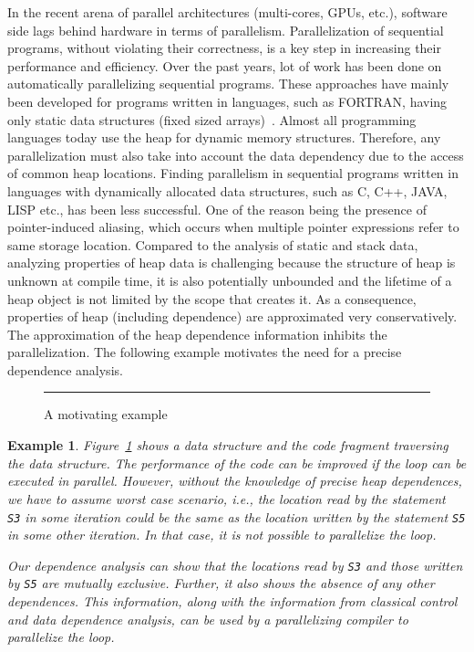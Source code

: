 \documentclass{IOS-Book-Article}
\newtheorem{example}{Example}
\begin{document}
In the recent arena of parallel architectures (multi-cores,
GPUs, etc.), software side lags behind hardware in terms of
parallelism. Parallelization of sequential programs, without
violating their correctness, is a key step in increasing
their performance and efficiency. Over the past years, lot of
work has been done on automatically parallelizing sequential
programs. These approaches have mainly been developed for
programs written in languages, such as FORTRAN, having only
static data structures (fixed sized
arrays)~\cite{Allen87automatic,Banerjee93automatic,Wolf91loop,
  Kennedy01Optimizing}.  Almost all programming languages
today use the heap for dynamic memory structures. Therefore,
any parallelization must also take into account the data
dependency due to the access of common heap
locations. Finding parallelism in sequential programs written
in languages with dynamically allocated data structures, such
as C, C++, JAVA, LISP etc., has been less successful. One of
the reason being the presence of pointer-induced aliasing,
which occurs when multiple pointer expressions refer to same
storage location. Compared to the analysis of static and
stack data, analyzing properties of heap data is challenging
because the structure of heap is unknown at compile time, it
is also potentially unbounded and the lifetime of a heap
object is not limited by the scope that creates it. As a
consequence, properties of heap (including dependence) are
approximated very conservatively. The approximation of the
heap dependence information inhibits the parallelization. The
following example motivates the need for a precise dependence
analysis.
  \begin{figure}[t]
    \centering
    
    \label{fig:motiv}
    \caption{A motivating example}
    \hrule
  \end{figure}
\begin{example}{\rm
  Figure~\ref{fig:motiv}
  shows a data structure and the code fragment traversing the
  data structure. The performance of the code can be improved if the loop can
  be executed in parallel. However, without the knowledge of
  precise heap dependences, we have to assume worst case
  scenario, i.e.,  the  location read by the statement {\tt
    S3} in some iteration could be the same as the location
  written by the statement {\tt S5} in some other iteration.
  In that case,  it is not possible to parallelize the loop.
 
  Our dependence analysis can show that the locations read by
  {\tt S3} and those written by {\tt S5} are mutually
  exclusive. Further, it also shows the absence of any other
  dependences.  This information, along with the information
  from classical control and data dependence analysis, can be
  used by a parallelizing compiler to parallelize the loop.
}
\hfill\psframebox{}  \end{example}
\end{document}

